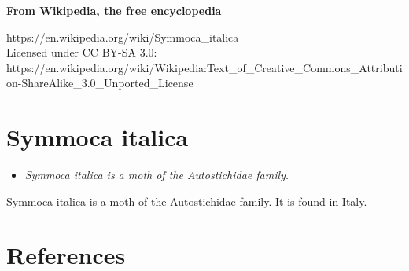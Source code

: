 \textbf{From Wikipedia, the free encyclopedia}

https://en.wikipedia.org/wiki/Symmoca\_italica\\
Licensed under CC BY-SA 3.0:\\
https://en.wikipedia.org/wiki/Wikipedia:Text\_of\_Creative\_Commons\_Attribution-ShareAlike\_3.0\_Unported\_License

\section{Symmoca italica}\label{symmoca-italica}

\begin{itemize}
\item
  \emph{Symmoca italica is a moth of the Autostichidae family.}
\end{itemize}

Symmoca italica is a moth of the Autostichidae family. It is found in
Italy.

\section{References}\label{references}
